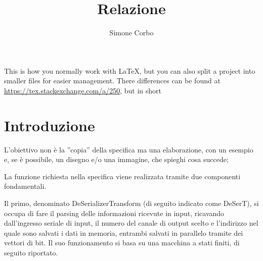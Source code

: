 \documentclass[twoside]{hcmut-report}
\title{Relazione}
\author{Simone Corbo}
\begin{document}
    \coverpage


    \tableofcontents

    \clearpage
    This is how you normally work with \LaTeX, but you can also split a project into smaller files for easier management.
    There differences can be found at \url{https://tex.stackexchange.com/a/250}, but in short


    \section{Introduzione}



    L'obiettivo non è la ''copia'' della specifica ma una elaborazione, con un esempio e, se è possibile, un disegno e/o una immagine, che spieghi cosa succede;

    La funzione richiesta nella specifica viene realizzata tramite due componenti fondamentali.

    Il primo, denominato DeSerializerTransform (di seguito indicato come DeSerT), si occupa di fare il parsing delle informazioni ricevute in input, ricavando dall'ingresso seriale di input, il numero del canale di output scelto e l'indirizzo nel quale sono salvati i dati in memoria, entrambi salvati in parallelo tramite dei vettori di bit.
    Il suo funzionamento si basa su una macchina a stati finiti, di seguito riportato.
\end{document}
